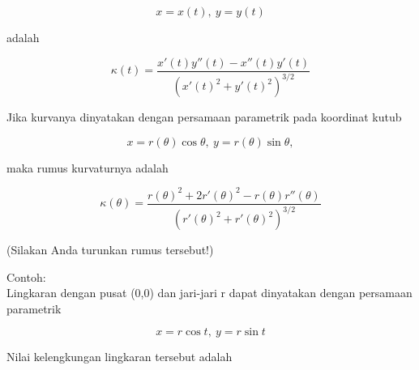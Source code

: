 \documentclass[12pt,Times new roman,letterpaper]{book}
\begin{document}
\begin{eulernootebook}
\begin{eulercomment}
\begin{eulercomment}
\begin{eulernootebook}
\begin{eulercomment}
\begin{eulercomment}
\begin{eulercomment}
\begin{eulercomment}
\begin{eulercomment}
\begin{eulercomment}
\begin{eulernotebook}
\begin{eulercomment}
\begin{eulercomment}
\begin{eulercomment}
\begin{eulercomment}
\begin{eulercomment}
\begin{eulercomment}
\begin{eulercomment}
\begin{eulercomment}
\begin{eulercomment}
\begin{eulercomment}
\begin{eulercomment}
\begin{eulercomment}
\begin{eulercomment}
\begin{eulercomment}
\begin{eulercomment}
\begin{eulercomment}
\begin{eulercomment}
\begin{eulercomment}
\begin{eulercomment}
\begin{eulercomment}
\begin{eulercomment}
\end{eulercomment}
\begin{eulerformula}
\[
x=x(t),\ y=y(t)
\]
\end{eulerformula}
\begin{eulercomment}
adalah

\end{eulercomment}
\begin{eulerformula}
\[
\kappa(t) = \frac{x'(t)y''(t)-x''(t)y'(t)}{\left(x'(t)^2+y'(t)^2\right)^{3/2}}
\]
\end{eulerformula}
\begin{eulercomment}
Jika kurvanya dinyatakan dengan persamaan parametrik pada koordinat
kutub

\end{eulercomment}
\begin{eulerformula}
\[
x=r(\theta)\cos\theta,\ y=r(\theta)\sin\theta,
\]
\end{eulerformula}
\begin{eulercomment}
maka rumus kurvaturnya adalah

\end{eulercomment}
\begin{eulerformula}
\[
\kappa(\theta) = \frac{r(\theta)^2+2r'(\theta)^2-r(\theta)r''(\theta)}{\left(r'(\theta)^2+r'(\theta)^2\right)^{3/2}}
\]
\end{eulerformula}
\begin{eulercomment}
(Silakan Anda turunkan rumus tersebut!)

Contoh:\\
Lingkaran dengan pusat (0,0) dan jari-jari r dapat dinyatakan dengan
persamaan parametrik

\end{eulercomment}
\begin{eulerformula}
\[
x=r\cos t,\ y=r\sin t
\]
\end{eulerformula}
\begin{eulercomment}
Nilai kelengkungan lingkaran tersebut adalah


\end{eulercomment}
\end{eulercomment}
\end{eulercomment}
\end{eulercomment}
\end{eulercomment}
\end{eulercomment}
\end{eulercomment}
\end{eulercomment}
\end{eulercomment}
\end{eulercomment}
\end{eulercomment}
\end{eulercomment}
\end{eulercomment}
\end{eulercomment}
\end{eulercomment}
\end{eulercomment}
\end{eulercomment}
\end{eulercomment}
\end{eulercomment}
\end{eulercomment}
\end{eulercomment}
\end{eulernotebook}
\end{eulercomment}
\end{eulercomment}
\end{eulercomment}
\end{eulercomment}
\end{eulercomment}
\end{eulercomment}
\end{eulernootebook}
\end{eulercomment}
\end{eulercomment}
\end{eulernootebook}
\end{document}
